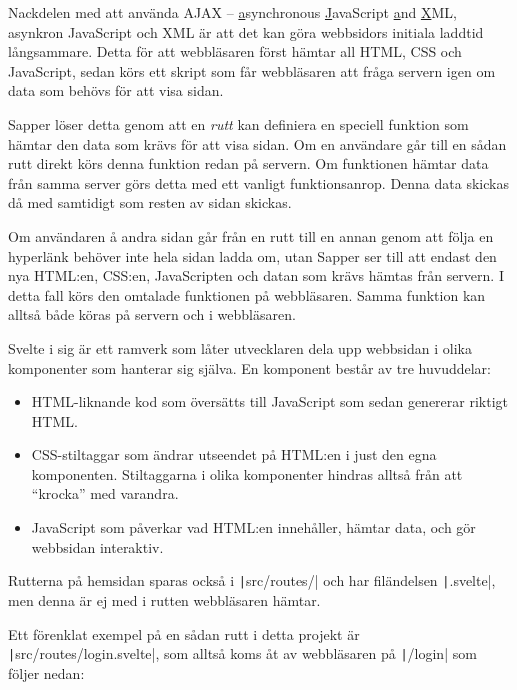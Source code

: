 \documentclass{article}
\begin{document}
Nackdelen med att använda AJAX \--- \underline{a}synchronous
\underline{J}avaScript \underline{a}nd \underline{X}ML, asynkron JavaScript och
XML är att det kan göra webbsidors initiala laddtid långsammare. Detta för att
webbläsaren först hämtar all HTML, CSS och JavaScript, sedan körs ett skript som
får webbläsaren att fråga servern igen om data som behövs för att visa sidan.

Sapper löser detta genom att en \textit{rutt} kan definiera en speciell funktion
som hämtar den data som krävs för att visa sidan. Om en användare går till en
sådan rutt direkt körs denna funktion redan på servern. Om funktionen hämtar
data från samma server görs detta med ett vanligt funktionsanrop. Denna data
skickas då med samtidigt som resten av sidan skickas.

Om användaren å andra sidan går från en rutt till en annan genom att följa en
hyperlänk behöver inte hela sidan ladda om, utan Sapper ser till att endast den
nya HTML:en, CSS:en, JavaScripten och datan som krävs hämtas från servern. I
detta fall körs den omtalade funktionen på webbläsaren. Samma funktion kan
alltså både köras på servern och i webbläsaren.

Svelte i sig är ett ramverk som låter utvecklaren dela upp webbsidan i olika
komponenter som hanterar sig själva. En komponent består av tre huvuddelar:

\begin{itemize}
	\item HTML-liknande kod som översätts till JavaScript som sedan genererar
		riktigt HTML.
	\item CSS-stiltaggar som ändrar utseendet på HTML:en i just den egna
		komponenten. Stiltaggarna i olika komponenter hindras alltså från att
		``krocka'' med varandra.
	\item JavaScript som påverkar vad HTML:en innehåller, hämtar data, och gör
		webbsidan interaktiv.
\end{itemize}

Rutterna på hemsidan sparas också i \texttt|src/routes/|
och har filändelsen \texttt|.svelte|, men denna är ej
med i rutten webbläsaren hämtar.

Ett förenklat exempel på en sådan rutt i detta projekt är
\texttt|src/routes/login.svelte|, som alltså koms åt av
webbläsaren på \texttt|/login| som följer nedan:
\end{document}
